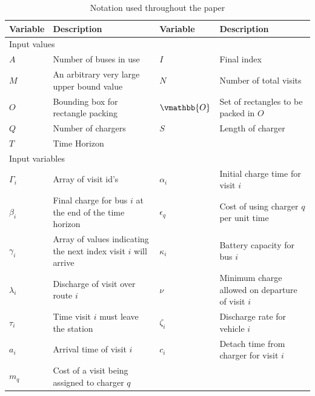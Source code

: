 \documentclass[letterpaper, 10pt, conference]{IEEEtran}
\begin{document}
\begin{table}[!t]
	\caption{Notation used throughout the paper}
	\label{tab:variables}
	\centering
	\begin{tabular}{l l l l}
		\toprule
		\textbf{Variable} & \textbf{Description} & \textbf{Variable} & \textbf{Description} \\
		\toprule
		\multicolumn{4}{l}{Input values} \\
			$A$           & Number of buses in use &
			$I$           & Final index                               \\
			$M$           & An arbitrary very large upper bound value &
			$N$           & Number of total visits                    \\
			$O$           & Bounding box for rectangle packing        &
			$\vmathbb{O}$ & Set of rectangles to be packed in \(O\)   \\
			$Q$           & Number of chargers                        &
			$S$           & Length of charger                         \\
			$T$           & Time Horizon                              \\
		\hline
		\multicolumn{4}{l}{Input variables} \\
			$\Gamma_i$   & Array of visit id's                                             &
			$\alpha_i$   & Initial charge time for visit  $i$                              \\
			$\beta_{i}$  & Final charge for bus $i$ at the end of the time horizon         &
			$\epsilon_q$ & Cost of using charger $q$ per unit time                         \\
			$\gamma_i$   & Array of values indicating the next index visit $i$ will arrive &
			$\kappa_i$   & Battery capacity for bus \(i\)                                  \\
			$\lambda_i$  & Discharge of visit over route  $i$                              &
			$\nu$        & Minimum charge allowed on departure of visit \(i\)              \\
			$\tau_i$     & Time visit $i$ must leave the station                           &
			$\zeta_i$    & Discharge rate for vehicle \(i\)                                \\
			$a_i$        & Arrival time of visit  $i$                                      &
			$c_i$        & Detach time from charger for visit \(i\)                        \\
			$m_q$        & Cost of a visit being assigned to charger  $q$                  &

\end{tabular}
\end{table}
\end{document}
